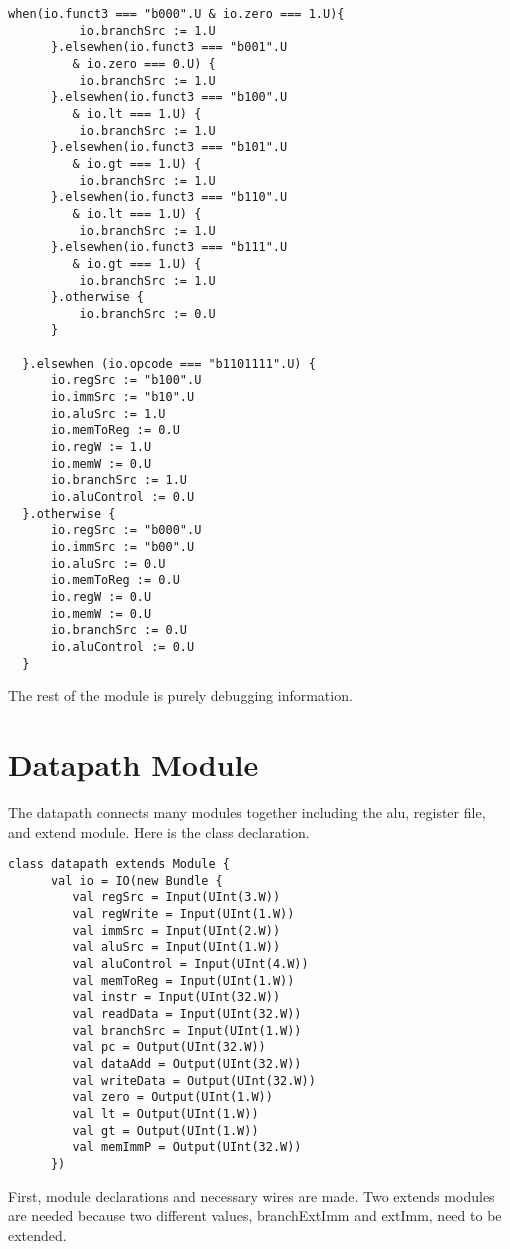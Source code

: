 \documentclass[12pt, letterpaper]{report}
\begin{document}
\begin{lstlisting}[style=scala]
      when(io.funct3 === "b000".U & io.zero === 1.U){
          io.branchSrc := 1.U
      }.elsewhen(io.funct3 === "b001".U 
         & io.zero === 0.U) {
          io.branchSrc := 1.U
      }.elsewhen(io.funct3 === "b100".U 
         & io.lt === 1.U) {
          io.branchSrc := 1.U
      }.elsewhen(io.funct3 === "b101".U 
         & io.gt === 1.U) {
          io.branchSrc := 1.U
      }.elsewhen(io.funct3 === "b110".U 
         & io.lt === 1.U) {
          io.branchSrc := 1.U
      }.elsewhen(io.funct3 === "b111".U 
         & io.gt === 1.U) {
          io.branchSrc := 1.U
      }.otherwise {
          io.branchSrc := 0.U
      }

  }.elsewhen (io.opcode === "b1101111".U) {
      io.regSrc := "b100".U
      io.immSrc := "b10".U
      io.aluSrc := 1.U
      io.memToReg := 0.U
      io.regW := 1.U
      io.memW := 0.U
      io.branchSrc := 1.U
      io.aluControl := 0.U
  }.otherwise {
      io.regSrc := "b000".U
      io.immSrc := "b00".U
      io.aluSrc := 0.U
      io.memToReg := 0.U
      io.regW := 0.U
      io.memW := 0.U
      io.branchSrc := 0.U
      io.aluControl := 0.U
  }
\end{lstlisting}

The rest of the module is purely debugging information.


\pagebreak
\section{Datapath Module}
The datapath connects many modules together including the alu, register file, and extend module.
Here is the class declaration.

\begin{lstlisting}[style=scala]
   class datapath extends Module {
      val io = IO(new Bundle {
         val regSrc = Input(UInt(3.W))
         val regWrite = Input(UInt(1.W))
         val immSrc = Input(UInt(2.W))
         val aluSrc = Input(UInt(1.W))
         val aluControl = Input(UInt(4.W))
         val memToReg = Input(UInt(1.W))
         val instr = Input(UInt(32.W))
         val readData = Input(UInt(32.W))
         val branchSrc = Input(UInt(1.W))
         val pc = Output(UInt(32.W))
         val dataAdd = Output(UInt(32.W))
         val writeData = Output(UInt(32.W))
         val zero = Output(UInt(1.W))
         val lt = Output(UInt(1.W))
         val gt = Output(UInt(1.W))
         val memImmP = Output(UInt(32.W))
      })
\end{lstlisting}

First, module declarations and necessary wires are made. Two extends modules are needed because 
two different values, branchExtImm and extImm, need to be extended.
\end{document}
